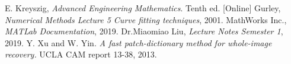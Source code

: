 \documentclass[a4paper,table]{article}
\begin{document}
\begin{thebibliography}{9}
  E. Kreyszig,
  \emph{Advanced Engineering Mathematics}.
   Tenth ed. [Online]
  Gurley,
  \emph{Numerical Methods Lecture 5 Curve fitting techniques},
   2001.
  MathWorks Inc.,
  \emph{MATLab Documentation},
   2019.
  Dr.Miaomiao Liu,
  \emph{Lecture Notes Semester 1},
   2019.
Y. Xu and W. Yin. \emph{A fast patch-dictionary method for whole-image recovery.} UCLA CAM report 13-38, 2013.
\end{thebibliography}
\end{document}
